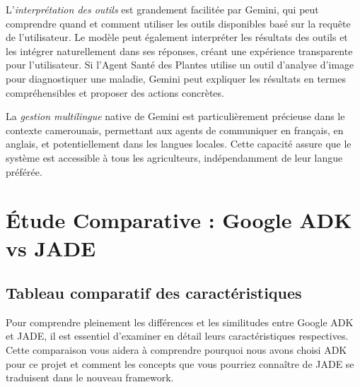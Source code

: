 L'\emph{interprétation des outils} est grandement facilitée par Gemini, qui peut comprendre quand et comment utiliser les outils disponibles basé sur la requête de l'utilisateur. Le modèle peut également interpréter les résultats des outils et les intégrer naturellement dans ses réponses, créant une expérience transparente pour l'utilisateur. Si l'Agent Santé des Plantes utilise un outil d'analyse d'image pour diagnostiquer une maladie, Gemini peut expliquer les résultats en termes compréhensibles et proposer des actions concrètes.

La \emph{gestion multilingue} native de Gemini est particulièrement précieuse dans le contexte camerounais, permettant aux agents de communiquer en français, en anglais, et potentiellement dans les langues locales. Cette capacité assure que le système est accessible à tous les agriculteurs, indépendamment de leur langue préférée.

\section{Étude Comparative : Google ADK vs JADE}

\subsection{Tableau comparatif des caractéristiques}

Pour comprendre pleinement les différences et les similitudes entre Google ADK et JADE, il est essentiel d'examiner en détail leurs caractéristiques respectives. Cette comparaison vous aidera à comprendre pourquoi nous avons choisi ADK pour ce projet et comment les concepts que vous pourriez connaître de JADE se traduisent dans le nouveau framework.

